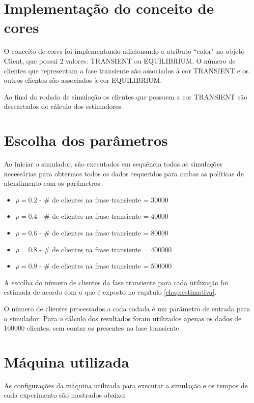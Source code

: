 \section{Implementação do conceito de cores}
O conceito de cores foi implementando adicionando o atributo ``color" no objeto Client, que possui 2 valores: TRANSIENT ou EQUILIBRIUM.  O número de clientes que representam a fase transiente são associados à cor TRANSIENT e os outros clientes são associados à cor EQUILIBRIUM.

Ao final da rodada de simulação os clientes que possuem a cor TRANSIENT são descartados do cálculo dos estimadores.

\section{Escolha dos parâmetros}
\label{sec:parametros}
Ao iniciar o simulador, são executados em sequência todas as simulações necessárias para obtermos todos os dados requeridos para ambas as políticas de atendimento com os parâmetros:
\begin{itemize}
  \item $\rho=0.2$ - \# de clientes na frase transiente = 30000
  \item $\rho=0.4$ - \# de clientes na frase transiente = 40000
  \item $\rho=0.6$ - \# de clientes na frase transiente = 80000
  \item $\rho=0.8$ - \# de clientes na frase transiente = 400000
  \item $\rho=0.9$ - \# de clientes na frase transiente = 500000
\end{itemize}

A escolha do número de clientes da fase transiente para cada utilização foi estimada de acordo com o que é exposto no capítulo \ref{chap:estimativa}.

O número de clientes processados a cada rodada é um parâmetro de entrada para o simulador. Para o cálculo dos resultados foram utilizados apenas os dados de 100000 clientes, sem contar os presentes na fase transiente.

\pagebreak
\section{Máquina utilizada}
As configurações da máquina utilizada para executar a simulação e os tempos de cada experimento são mostrados abaixo:\\

